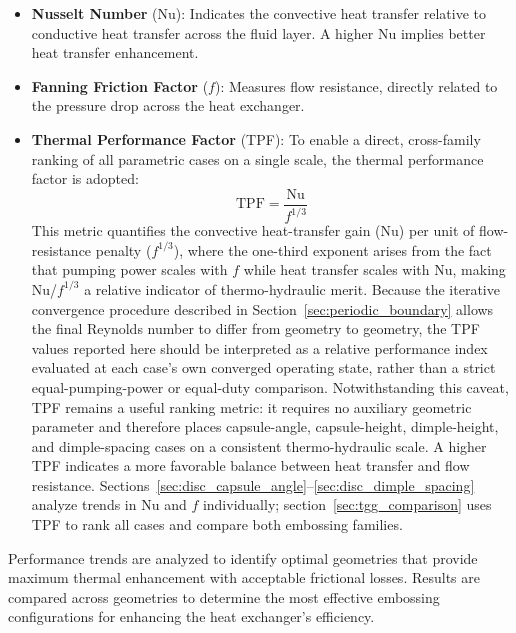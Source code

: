 \documentclass[review,12pt]{elsarticle}
\begin{document}
\begin{itemize}
  \item \textbf{Nusselt Number} (Nu): Indicates the convective heat transfer relative to conductive heat transfer across the fluid layer. A higher Nu implies better heat transfer enhancement.

  \item \textbf{Fanning Friction Factor} ($f$): Measures flow resistance, directly related to the pressure drop across the heat exchanger.

  \item \textbf{Thermal Performance Factor} (TPF): To enable a direct, cross-family ranking of all parametric cases on a single scale, the thermal performance factor is adopted:
  \begin{equation}
  \text{TPF} = \frac{\text{Nu}}{f^{1/3}}
  \label{eq:tpf}
  \end{equation}
  This metric quantifies the convective heat-transfer gain (Nu) per unit of flow-resistance penalty ($f^{1/3}$), where the one-third exponent arises from the fact that pumping power scales with $f$ while heat transfer scales with Nu, making Nu/$f^{1/3}$ a relative indicator of thermo-hydraulic merit. Because the iterative convergence procedure described in Section~\ref{sec:periodic_boundary} allows the final Reynolds number to differ from geometry to geometry, the TPF values reported here should be interpreted as a relative performance index evaluated at each case's own converged operating state, rather than a strict equal-pumping-power or equal-duty comparison. Notwithstanding this caveat, TPF remains a useful ranking metric: it requires no auxiliary geometric parameter and therefore places capsule-angle, capsule-height, dimple-height, and dimple-spacing cases on a consistent thermo-hydraulic scale. A higher TPF indicates a more favorable balance between heat transfer and flow resistance. Sections~\ref{sec:disc_capsule_angle}--\ref{sec:disc_dimple_spacing} analyze trends in Nu and $f$ individually; section~\ref{sec:tgg_comparison} uses TPF to rank all cases and compare both embossing families.
\end{itemize}

Performance trends are analyzed to identify optimal geometries that provide maximum thermal enhancement with acceptable frictional losses. Results are compared across geometries to determine the most effective embossing configurations for enhancing the heat exchanger's efficiency.
\end{document}
